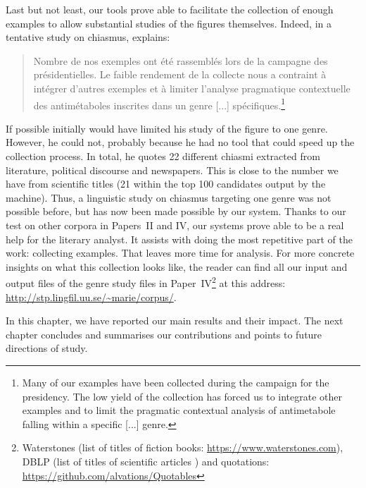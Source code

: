 Last but not least, our tools prove able to facilitate the collection of enough examples to allow substantial studies of the figures themselves. Indeed, in a tentative study on chiasmus, \citet[p. 22]{rabatel} explains:
\begin{quotation}
Nombre de nos exemples ont été rassemblés lors de la campagne des présidentielles. Le faible rendement de la collecte nous a contraint à intégrer d’autres exemples et à limiter l’analyse pragmatique contextuelle des antimétaboles inscrites dans un genre [...] spécifiques.\footnote{Many of our examples have been collected during the campaign for the presidency. The low yield of the collection has forced us to integrate other examples and to limit the pragmatic contextual analysis of antimetabole falling within a specific [...] genre.}
\end{quotation}
\noindent
If possible \cite{rabatel} initially would have limited his study of the figure to one genre. However, he could not, probably because he had no tool that could speed up the collection process. In total, he quotes 22 different chiasmi extracted from literature, political discourse and newspapers. This is close to the number we have from scientific titles (21 within the top 100 candidates output by the machine). Thus, a linguistic study on chiasmus targeting one genre was not possible before, but has now been made possible by our system. Thanks to our test on other corpora in Papers~II and IV, our systems prove able to be a real help for the literary analyst. It assists with doing the most repetitive part of the work: collecting examples. That leaves more time for analysis. For more concrete insights on what this collection looks like, the reader can find all our input and output files of the genre study files in Paper~IV\footnote{Waterstones (list of titles of fiction books: \url{https://www.waterstones.com}), DBLP (list of titles of scientific articles \citep{Ley2002}) and quotations: \url{https://github.com/alvations/Quotables}} at this address:  \url{http://stp.lingfil.uu.se/~marie/corpus/}.

In this chapter, we have reported our main results and their impact. The next chapter concludes and summarises our contributions and points to future directions of study.